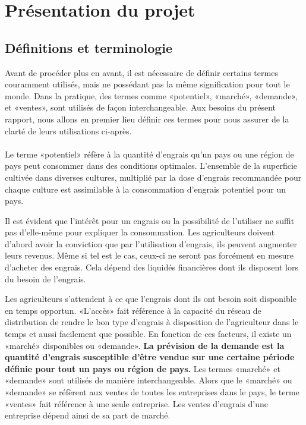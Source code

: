 \section{Présentation du projet}
	\subsection{Définitions et terminologie}
	Avant de procéder plus en avant, il est nécessaire de définir certains termes couramment utilisés, mais ne possédant pas la même signification pour tout le monde. Dans la pratique, des termes comme «potentiel», «marché», «demande», et «ventes», sont utilisés de façon interchangeable. Aux besoins du présent rapport, nous allons en premier lieu définir ces termes pour nous assurer de la clarté de leurs utilisations ci-après.
	\paragraph*{}
	Le terme «potentiel»  réfère à la quantité d'engrais qu'un pays ou une région de pays peut consommer dans des conditions optimales. L'ensemble de la superficie cultivée dans diverses cultures, multiplié par la dose d'engrais recommandée pour chaque culture est assimilable à la consommation d'engrais potentiel pour un pays.\par
	Il est évident que l'intérêt pour un engrais ou la possibilité de l'utiliser ne suffit pas d'elle-même pour expliquer la consommation. Les agriculteurs doivent d'abord avoir la conviction que par l'utilisation d'engrais, ils peuvent augmenter leurs revenus. Même si tel est le cas, ceux-ci ne seront pas forcément en mesure d'acheter des engrais. Cela dépend des liquidés financières dont ils disposent lors du besoin de l'engrais.\par
	Les agriculteurs s'attendent à ce que l'engrais dont ils ont besoin soit disponible en temps opportun. «L'accès» fait référence à la capacité du réseau de distribution de rendre le bon type d'engrais à disposition de l'agriculteur dans le temps et aussi facilement que possible. En fonction de ces facteurs, il existe un «marché» disponibles ou «demande». \textbf{La prévision de la demande est la quantité d'engrais susceptible d'être vendue sur une certaine période définie pour tout un pays ou région de pays.} Les termes «marché» et «demande» sont utilisés de manière interchangeable. Alors que le «marché» ou «demande» se réfèrent aux ventes de toutes les entreprises dans le pays, le terme «ventes» fait référence à une seule entreprise. Les ventes d'engrais d'une entreprise dépend ainsi de sa part de marché.
